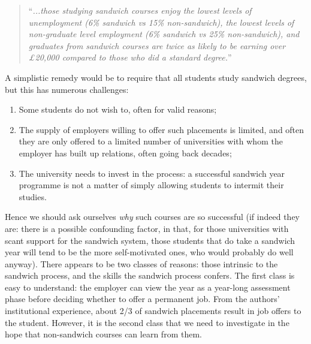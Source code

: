 \documentclass[conference]{IEEEtran}
\begin{document}
\begin{quote} ``{\emph{...those studying sandwich courses enjoy the lowest levels
of unemployment (6\% sandwich vs 15\% non-sandwich), the lowest levels
of non-graduate level employment (6\% sandwich vs 25\% non-sandwich),
and graduates from sandwich courses are twice as likely to be earning
over \pounds20,000 compared to those who did a standard
degree.}}''~\cite{Shadbolt2016a}
\end{quote}

A simplistic remedy would be to require that all students study
sandwich degrees, but this has numerous challenges:

\begin{enumerate}
\item Some students do not wish to, often for valid reasons;
\item The supply of employers willing to offer such placements is
limited, and often they are only offered to a limited number of
universities with whom the employer has built up relations, often
going back decades;
\item The university needs to invest in the process: a successful
sandwich year programme is not a matter of simply allowing students to
intermit their studies.
\end{enumerate}

Hence we should ask ourselves \emph{why} such courses are so
successful (if indeed they are: there is a possible confounding
factor, in that, for those universities with scant support for the
sandwich system, those students that do take a sandwich year will tend
to be the more self-motivated ones, who would probably do well
anyway). There appears to be two classes of reasons: those intrinsic
to the sandwich process, and the skills the sandwich process
confers. The first class is easy to understand: the employer can view
the year as a year-long assessment phase before deciding whether to
offer a permanent job. From the authors' institutional experience,
about 2/3 of sandwich placements result in job offers to the
student. However, it is the second class that we need to investigate
in the hope that non-sandwich courses can learn from them.


\end{document}
